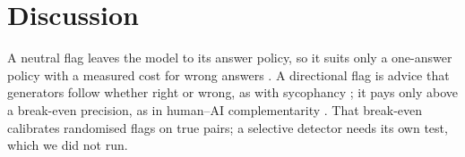 \section{Discussion}
\label{sec:discussion}

A neutral flag leaves the model to its answer policy, so it suits only a one-answer policy with a measured cost for
wrong answers \citep{wen2025abstention}. A directional flag is advice that generators follow whether
right or wrong, as with sycophancy \citep{sharma2024sycophancy}; it pays only above a break-even precision, as in
human--AI complementarity \citep{bansal2021accurate,mozannar2020defer}. That break-even calibrates randomised flags on
true pairs; a selective detector needs its own test, which we did not run.
